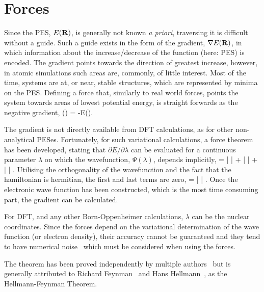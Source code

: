 \section{Forces}
\label{sec:force}
Since the PES, $E({\mathrm{\mathbf{\bm{R}}}})$, is generally not known \textit{a priori}, traversing it is difficult without a guide.
Such a guide exists in the form of the gradient, $\nabla E({\mathrm{\mathbf{\bm{R}}}})$, in which information about the increase/decrease of the function (here: PES) is encoded.
The gradient points towards the direction of greatest increase, however, in atomic simulations such areas are, commonly, of little interest.
Most of the time, systems are at, or near, stable structures, which are represented by minima on the PES.
Defining a force that, similarly to real world forces, points the system towards areas of lowest potential energy, is straight forwards as the negative gradient,
\vF(\vR) = -\nabla E(\vR).
\eeq

The gradient is not directly available from DFT calculations, as for other non-analytical PESes.
Fortunately, for such variational calculations, a force theorem has been developed, stating that $\partial E / \partial\lambda$ can be evaluated for a continuous parameter $\lambda$ on which the wavefunction, $\Psi(\lambda)$, depends implicitly,
 = 
\bra \frac{\partial \Psi}{\partial \lambda} |  | \Psi \ket +
\bra \Psi |  | \Psi \ket +
\bra \Psi |  | \frac{\partial \Psi}{\partial \lambda} \ket.
\eeq
Utilising the orthogonality of the wavefunction and the fact that the hamiltonian is hermitian, the first and last terms are zero, 
 = \bra \Psi |  | \Psi \ket.
\eeq
Once the electronic wave function has been constructed, which is the most time consuming part, the gradient can be calculated.

For DFT, and any other Born-Oppenheimer calculations, $\lambda$ can be the nuclear coordinates.
Since the forces depend on the variational determination of the wave function (or electron density), their accuracy cannot be guaranteed and they tend to have numerical noise~\cite{gpaw-2005} which must be considered when using the forces.

The theorem has been proved independently by multiple authors~\cite{forces-pauli-1933, forces-guttinger-1932} but is generally attributed to Richard Feynman~\cite{forces-feynman-1939} and Hans Hellmann~\cite{forces-hellmann-1937}, as the Hellmann-Feynman Theorem.
